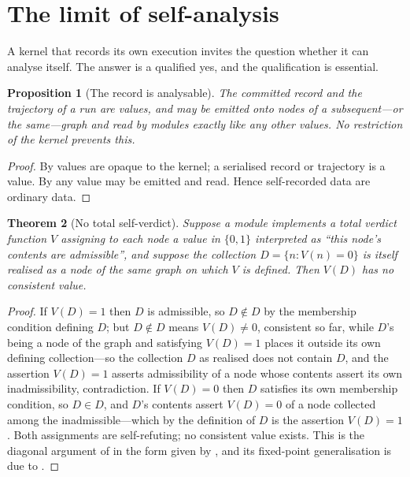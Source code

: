 \documentclass[11pt,a4paper]{article}
\theoremstyle{thmstyle}
\newtheorem{theorem}{Theorem}[section]
\newtheorem{proposition}[theorem]{Proposition}
\theoremstyle{definition}
\theoremstyle{remark}
\newcommand{\Node}{n}
\begin{document}




\section{The limit of self-analysis}
\label{sec:selfanalysis}

A kernel that records its own execution invites the question whether it can
analyse itself. The answer is a qualified yes, and the qualification is
essential.

\begin{proposition}[The record is analysable]
\label{prop:self-record}
The committed record and the trajectory of a run are values, and may be
emitted onto nodes of a subsequent---or the same---graph and read by modules
exactly like any other values. No restriction of the kernel prevents this.
\end{proposition}

\begin{proof}
By  values are opaque to the kernel; a serialised record or
trajectory is a value. By  any value may be emitted and
read. Hence self-recorded data are ordinary data.
\end{proof}

\begin{theorem}[No total self-verdict]
\label{thm:diagonal}
Suppose a module implements a total verdict function $V$ assigning to each
node a value in $\{0,1\}$ interpreted as ``this node's contents are
admissible'', and suppose the collection
$D=\{\Node : V(\Node)=0\}$ is itself realised as a node of the same graph on
which $V$ is defined. Then $V(D)$ has no consistent value.
\end{theorem}

\begin{proof}
If $V(D)=1$ then $D$ is admissible, so $D\notin D$ by the membership
condition defining $D$; but $D\notin D$ means $V(D)\ne0$, consistent so far,
while $D$'s being a node of the graph and satisfying $V(D)=1$ places it
outside its own defining collection---so the collection $D$ as realised does
not contain $D$, and the assertion $V(D)=1$ asserts admissibility of a node
whose contents assert its own inadmissibility, contradiction. If $V(D)=0$
then $D$ satisfies its own membership condition, so $D\in D$, and $D$'s
contents assert $V(D)=0$ of a node collected among the inadmissible---which
by the definition of $D$ is the assertion $V(D)=1$. Both assignments are
self-refuting; no consistent value exists. This is the diagonal argument of
\citet{cantor1891} in the form given by \citet{russell1903}, and its
fixed-point generalisation is due to \citet{lawvere1969}.
\end{proof}
\end{document}
